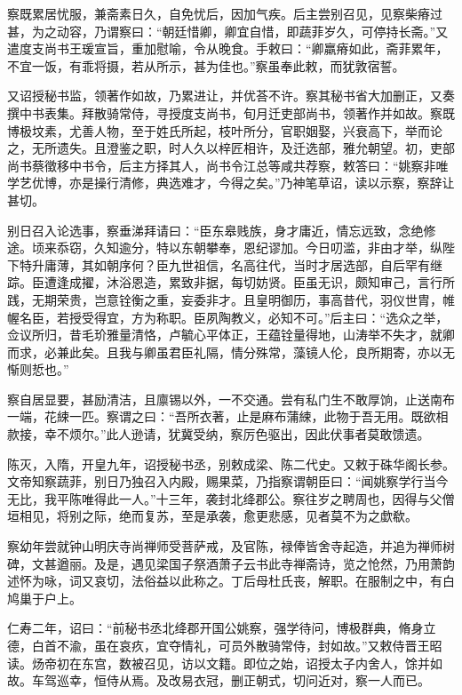 \documentclass[]{article}
\begin{document}
察既累居忧服，兼斋素日久，自免忧后，因加气疾。后主尝别召见，见察柴瘠过甚，为之动容，乃谓察曰：``朝廷惜卿，卿宜自惜，即蔬菲岁久，可停持长斋。''又遣度支尚书王瑗宣旨，重加慰喻，令从晚食。手敕曰：``卿羸瘠如此，斋菲累年，不宜一饭，有乖将摄，若从所示，甚为佳也。''察虽奉此敕，而犹敦宿誓。

又诏授秘书监，领著作如故，乃累进让，并优荅不许。察其秘书省大加删正，又奏撰中书表集。拜散骑常侍，寻授度支尚书，旬月迁吏部尚书，领著作并如故。察既博极坟素，尤善人物，至于姓氏所起，枝叶所分，官职姻娶，兴衰高下，举而论之，无所遗失。且澄鉴之职，时人久以梓匠相许，及迁选部，雅允朝望。初，吏部尚书蔡徵移中书令，后主方择其人，尚书令江总等咸共荐察，敕答曰：``姚察非唯学艺优博，亦是操行清修，典选难才，今得之矣。''乃神笔草诏，读以示察，察辞让甚切。

别日召入论选事，察垂涕拜请曰：``臣东皋贱族，身才庸近，情忘远致，念绝修途。顷来忝窃，久知逾分，特以东朝攀奉，恩纪谬加。今日叨滥，非由才举，纵陛下特升庸薄，其如朝序何？臣九世祖信，名高往代，当时才居选部，自后罕有继踪。臣遭逢成擢，沐浴恩造，累致非据，每切妨贤。臣虽无识，颇知审己，言行所践，无期荣贵，岂意铨衡之重，妄委非才。且皇明御历，事高昔代，羽仪世胄，帷幄名臣，若授受得宜，方为称职。臣夙陶教义，必知不可。''后主曰：``选众之举，佥议所归，昔毛玠雅量清恪，卢毓心平体正，王蕴铨量得地，山涛举不失才，就卿而求，必兼此矣。且我与卿虽君臣礼隔，情分殊常，藻镜人伦，良所期寄，亦以无惭则悊也。''

察自居显要，甚励清洁，且廪锡以外，一不交通。尝有私门生不敢厚饷，止送南布一端，花綀一匹。察谓之曰：``吾所衣著，止是麻布蒲綀，此物于吾无用。既欲相款接，幸不烦尔。''此人逊请，犹冀受纳，察厉色驱出，因此伏事者莫敢馈遗。

陈灭，入隋，开皇九年，诏授秘书丞，别敕成梁、陈二代史。又敕于硃华阁长参。文帝知察蔬菲，别日乃独召入内殿，赐果菜，乃指察谓朝臣曰：``闻姚察学行当今无比，我平陈唯得此一人。''十三年，袭封北绛郡公。察往岁之聘周也，因得与父僧垣相见，将别之际，绝而复苏，至是承袭，愈更悲感，见者莫不为之歔欷。

察幼年尝就钟山明庆寺尚禅师受菩萨戒，及官陈，禄俸皆舍寺起造，并追为禅师树碑，文甚遒丽。及是，遇见梁国子祭酒萧子云书此寺禅斋诗，览之怆然，乃用萧韵述怀为咏，词又哀切，法俗益以此称之。丁后母杜氏丧，解职。在服制之中，有白鸠巢于户上。

仁寿二年，诏曰：``前秘书丞北绛郡开国公姚察，强学待问，博极群典，脩身立德，白首不渝，虽在哀疚，宜夺情礼，可员外散骑常侍，封如故。''又敕侍晋王昭读。炀帝初在东宫，数被召见，访以文籍。即位之始，诏授太子内舍人，馀并如故。车驾巡幸，恒侍从焉。及改易衣冠，删正朝式，切问近对，察一人而已。
\end{document}
